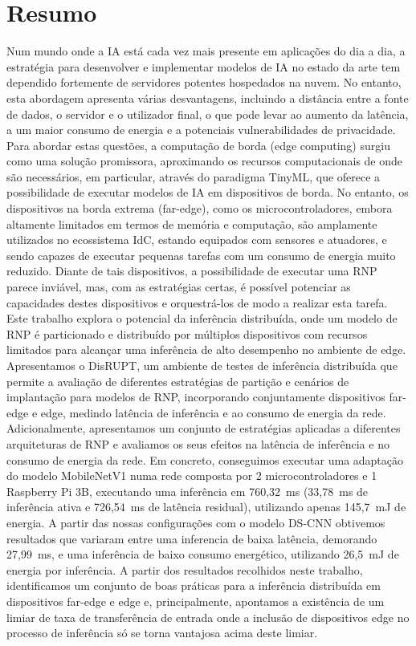 \chapter*{Resumo}
%

Num mundo onde a \ac{IA} está cada vez mais presente em aplicações do dia a dia, 
a estratégia para desenvolver e implementar modelos de \ac{IA} no estado da arte tem 
dependido fortemente de servidores potentes hospedados na nuvem. No entanto, esta 
abordagem apresenta várias desvantagens, incluindo a distância entre a fonte de dados, 
o servidor e o utilizador final, o que pode levar ao aumento da latência, a um maior 
consumo de energia e a potenciais vulnerabilidades de privacidade. Para abordar estas 
questões, a computação de borda (edge computing) surgiu como uma solução promissora, 
aproximando os recursos computacionais de onde são necessários, em particular, através 
do paradigma TinyML, que oferece a possibilidade de executar modelos de \ac{IA} em 
dispositivos de borda. No entanto, os dispositivos na borda extrema (far-edge), 
como os microcontroladores, embora altamente limitados em termos de memória e 
computação, são amplamente utilizados no ecossistema \ac{IdC}, estando equipados com 
sensores e atuadores, e sendo capazes de executar pequenas tarefas com um consumo de 
energia muito reduzido. Diante de tais dispositivos, a possibilidade de executar uma 
\ac{RNP} parece inviável, mas, com as estratégias certas, é possível potenciar as 
capacidades destes dispositivos e orquestrá-los de modo a realizar esta tarefa. Este 
trabalho explora o potencial da inferência distribuída, onde um modelo de \ac{RNP} é 
particionado e distribuído por múltiplos dispositivos com recursos limitados para 
alcançar uma inferência de alto desempenho no ambiente de edge. Apresentamos o 
\ac{DisRUPT}, um ambiente de testes de inferência distribuída que permite a 
avaliação de diferentes estratégias de partição e cenários de implantação 
para modelos de \ac{RNP}, incorporando conjuntamente dispositivos far-edge e edge, 
medindo latência de inferência e ao consumo de energia da rede. 
Adicionalmente, apresentamos um conjunto de estratégias aplicadas a diferentes 
arquiteturas de \ac{RNP} e avaliamos os seus efeitos na latência de inferência e no 
consumo de energia da rede. Em concreto, conseguimos executar uma adaptação do modelo
MobileNetV1 numa rede composta por 2 microcontroladores e 1 Raspberry Pi 3B,
executando uma inferência em 760,32~ms (33,78~ms de inferência ativa e 726,54~ms de
latência residual), utilizando apenas 145,7~mJ de energia. A partir das nossas
configurações com o modelo \ac{DS-CNN} obtivemos resultados que variaram entre uma
inferencia de baixa latência, demorando 27,99~ms, e uma inferência de baixo consumo
energético, utilizando 26,5~mJ de energia por inferência. A partir dos resultados 
recolhidos neste trabalho, identificamos um conjunto de boas práticas para a 
inferência distribuída em dispositivos far-edge e edge e, principalmente, apontamos 
a existência de um limiar de taxa de transferência de entrada onde a inclusão de 
dispositivos edge no processo de inferência só se torna vantajosa acima deste limiar.

